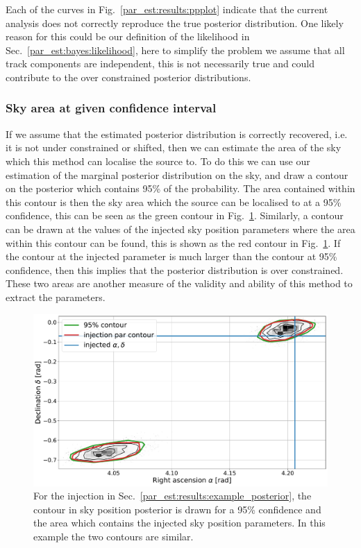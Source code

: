 Each of the curves in Fig.~\ref{par_est:results:ppplot} indicate that the current analysis does not correctly reproduce the true posterior distribution. 
One likely reason for this could be our definition of the likelihood in Sec.~\ref{par_est:bayes:likelihood}, here to simplify the problem we assume that all track components are independent, this is not necessarily true and could contribute to the over constrained posterior distributions. 

%
%
\subsubsection{\label{par_est:results:simulations:skyarea}Sky area at given confidence interval}
%
%

If we assume that the estimated posterior distribution is correctly recovered, i.e. it is not under constrained or shifted, then we can estimate the area of the sky which this method can localise the source to. 
To do this we can use our estimation of the marginal posterior distribution on the sky, and draw a contour on the posterior which contains 95\% of the probability.
The area contained within this contour is then the sky area which the source can be localised to at a 95\% confidence, this can be seen as the green contour in Fig.~\ref{par_est:results:sky_area_example}.
Similarly, a contour can be drawn at the values of the injected sky position parameters where the area within this contour can be found, this is shown as the red contour in Fig.~\ref{par_est:results:sky_area_example}.
If the contour at the injected parameter is much larger than the contour at 95\% confidence, then this implies that the posterior distribution is over constrained.
These two areas are another measure of the validity and ability of this method to extract the parameters. 
%
\begin{figure}[ht]
    \centering
    \includegraphics[width=\linewidth]{C5_parameter/skyarea_example.pdf}
    \caption[Area of sky at 95\% confidence]{For the injection in Sec.~\ref{par_est:results:example_posterior}, the contour in sky position posterior is drawn for a 95\% confidence and the area which contains the injected sky position parameters. In this example the two contours are similar.}
    \label{par_est:results:sky_area_example}
\end{figure}

